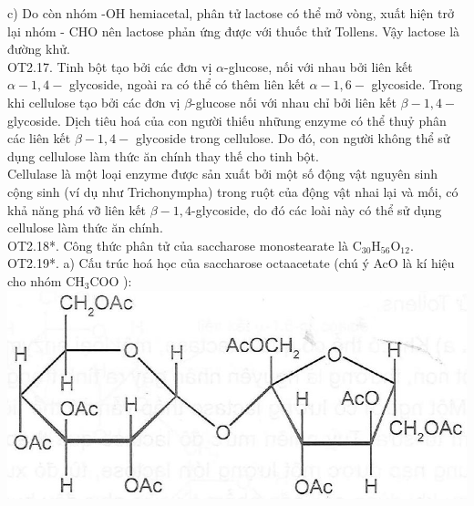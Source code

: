 \documentclass[10pt]{article}
\begin{document}
c) Do còn nhóm -OH hemiacetal, phân tử lactose có thể mở vòng, xuất hiện trở lại nhóm - CHO nên lactose phản ứng được với thuốc thử Tollens. Vậy lactose là đường khử.\\
OT2.17. Tinh bột tạo bởi các đơn vị $\alpha$-glucose, nối với nhau bởi liên kết $\alpha-1,4-$ glycoside, ngoài ra có thể có thêm liên kết $\alpha-1,6-$ glycoside. Trong khi cellulose tạo bởi các đơn vị $\beta$-glucose nối với nhau chỉ bởi liên kết $\beta-1,4-$ glycoside. Dịch tiêu hoá của con người thiếu nhữung enzyme có thể thuỷ phân các liên kết $\beta-1,4-$ glycoside trong cellulose. Do đó, con người không thể sử dụng cellulose làm thức ăn chính thay thế cho tinh bột.\\
Cellulase là một loại enzyme được sản xuất bởi một số động vật nguyên sinh cộng sinh (ví dụ như Trichonympha) trong ruột của động vật nhai lại và mối, có khả năng phá vỡ liên kết $\beta-1,4$-glycoside, do đó các loài này có thể sử dụng cellulose làm thức ăn chính.\\
OT2.18*. Công thức phân tử của saccharose monostearate là $\mathrm{C}_{30} \mathrm{H}_{56} \mathrm{O}_{12}$. OT2.19*. a) Cấu trúc hoá học của saccharose octaacetate (chú ý AcO là kí hiệu cho nhóm $\mathrm{CH}_{3} \mathrm{COO}$ ):\\
\includegraphics[max width=\textwidth, center]{2025_10_23_b4e16b74380d0f7e7700g-041}
\end{document}
